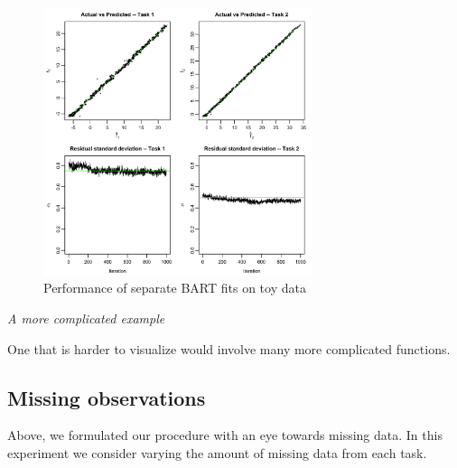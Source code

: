 \documentclass[12pt]{article}
\begin{document}
\begin{figure}[H]
\centering
\includegraphics[width = 0.7\textwidth]{../images/toy_sepBART_fit.png}
\caption{Performance of separate BART fits on toy data}
\label{fig:toy_sepBART_fit}
\end{figure}

\textit{A more complicated example}

One that is harder to visualize would involve many more complicated functions.



\subsection{Missing observations}
Above, we formulated our procedure with an eye towards missing data.
In this experiment we consider varying the amount of missing data from each task.



\newpage
\end{document}

